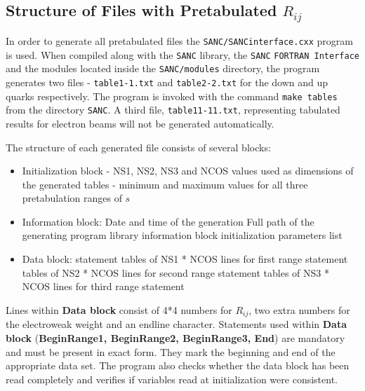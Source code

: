 \documentclass[]{Tauola_interface_design}
\begin{document}
\subsection{Structure of Files with Pretabulated $R_{ij}$}

In order to generate all pretabulated files the {\tt SANC/SANCinterface.cxx} program is used.
When compiled along with the {\tt SANC} library, the {\tt SANC}  {\tt FORTRAN Interface} and the modules located inside the {\tt SANC/modules} directory,
the program generates two files - {\tt table1-1.txt} and {\tt table2-2.txt} for the down and up quarks respectively.
The program is  invoked with the command {\tt make tables} from the directory {\tt SANC}. 
A third file, {\tt table11-11.txt}, representing tabulated results  for  electron beams
 will   not be generated automatically. 

The structure of each generated file consists of  several blocks:

\begin{itemize}
  \item Initialization block
     - NS1, NS2, NS3 and NCOS values used
             as dimensions of the generated  tables
     - minimum and maximum values for all three 
             pretabulation ranges of $s$
  \item Information block:
    \subitem Date and time of the generation
    \subitem Full path of the generating program
     library information block
     initialization parameters list
  \item Data block:
     statement
    \subitem tables of NS1 * NCOS  lines for first range
     statement
    \subitem tables of NS2 * NCOS  lines for second range
     statement
    \subitem tables of NS3 * NCOS  lines  for third range
     statement
\end{itemize}

Lines  within {\bf Data block} consist of 4*4 numbers for $R_{ij}$,
 two extra numbers for the electroweak weight and  an endline character.
Statements used within {\bf Data block} ({\bf BeginRange1, BeginRange2, BeginRange3, End})
are mandatory and must be present in exact form. They mark the beginning and end
of the appropriate data set. The program also checks whether the data block has been
read completely and verifies if variables read at initialization were consistent.
\end{document}
